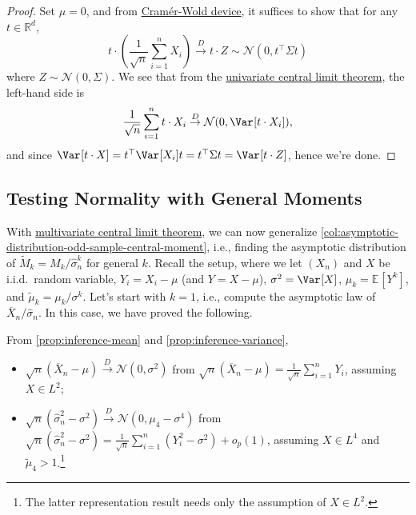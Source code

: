 \begin{proof}
	Set \(\mu = 0\), and from \hyperref[thm:Cramer-Wold-device]{Cramér-Wold device}, it suffices to show that for any \(t \in \mathbb{R} ^d\),
	\[
		t \cdot \left( \frac{1}{\sqrt{n} } \sum_{i=1}^{n} X_i \right)
		\overset{D}{\to} t \cdot Z
		\sim \mathcal{N} (0, t ^{\top} \Sigma t)
	\]
	where \(Z \sim \mathcal{N} (0, \Sigma )\). We see that from the \hyperref[thm:CLT]{univariate central limit theorem}, the left-hand side is
	\[
		\frac{1}{\sqrt{n} } \sum_{i=1}^{n} t \cdot X_i
		\overset{D}{\to} \mathcal{N} (0, \Var_{}[t\cdot X_i] ),
	\]
	and since \(\Var_{}[t \cdot X] = t^{\top} \Var_{}[X_i] t = t ^{\top} \Sigma t = \Var_{}[t \cdot Z] \), hence we're done.
\end{proof}

\subsection{Testing Normality with General Moments}
With \hyperref[thm:multivariate-CLT]{multivariate central limit theorem}, we can now generalize \autoref{col:asymptotic-distribution-odd-sample-central-moment}, i.e., finding the asymptotic distribution of \(\widetilde{M} _k = M_k / \hat{\sigma} _n^k\) for general \(k\). Recall the setup, where we let \((X_n)\) and \(X\) be i.i.d.\ random variable, \(Y_i = X_i - \mu \) (and \(Y = X - \mu \)), \(\sigma ^2 = \Var_{}[X] \), \(\mu _k = \mathbb{E}_{}[Y^k] \), and \(\widetilde{\mu} _k = \mu _k / \sigma ^k\). Let's start with \(k = 1\), i.e., compute the asymptotic law of \(\overline{X} _n / \hat{\sigma} _n\). In this case, we have proved the following.

\begin{prev}
	From \autoref{prop:inference-mean} and \autoref{prop:inference-variance},
	\begin{itemize}
		\item \(\sqrt{n} (\overline{X} _n - \mu ) \overset{D}{\to} \mathcal{N} (0, \sigma ^2)\) from \(\sqrt{n} (\overline{X} _n - \mu ) = \frac{1}{\sqrt{n} } \sum_{i=1}^{n} Y_i\), assuming \(X \in L^2\);
		\item \(\sqrt{n} (\hat{\sigma} _n^2 - \sigma ^2) \overset{D}{\to} \mathcal{N} (0, \mu _4 - \sigma ^4) \) from \(\sqrt{n} (\hat{\sigma} _n^2 - \sigma ^2) = \frac{1}{\sqrt{n} } \sum_{i=1}^{n} (Y_i^2 - \sigma ^2) + o_p(1)\), assuming \(X \in L^4\) and \(\widetilde{\mu} _4 > 1\).\footnote{The latter representation result needs only the assumption of \(X \in L^2\).}
	\end{itemize}
\end{prev}

